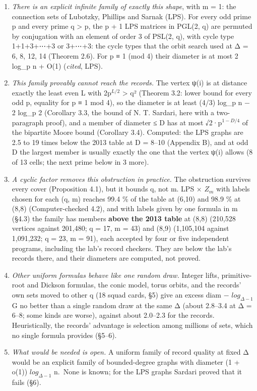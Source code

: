 \documentclass[
  10pt,
]{article}
\providecommand{\tightlist}{%
  \setlength{\itemsep}{0pt}\setlength{\parskip}{0pt}}
\begin{document}
\begin{enumerate}
\def\labelenumi{\arabic{enumi}.}
\tightlist
\item
  \emph{There is an explicit infinite family of exactly this shape},
  with m = 1: the connection sets of Lubotzky, Phillips and Sarnak
  (LPS). For every odd prime p and every prime q \textgreater{} p, the p
  + 1 LPS matrices in PGL(2, q) are permuted by conjugation with an
  element of order 3 of PSL(2, q), with cycle type 1+1+3+⋯+3 or 3+⋯+3:
  the cycle types that the orbit search used at Δ = 6, 8, 12, 14
  (Theorem 2.6). For p ≡ 1 (mod 4) their diameter is at most 2 log\_p n
  + O(1) (\emph{cited}, LPS).
\item
  \emph{This family provably cannot reach the records.} The vertex ψ(i)
  is at distance exactly the least even L with 2p\(^{L/2}\)
  \textgreater{} q² (Theorem 3.2: lower bound for every odd p, equality
  for p ≡ 1 mod 4), so the diameter is at least (4/3) log\_p n − 2
  log\_p 2 (Corollary 3.3, the bound of N. T. Sardari, here with a
  two-paragraph proof), and a member of diameter ≤ D has at most
  √2·p\(^{1−D/4}\) of the bipartite Moore bound (Corollary 3.4).
  Computed: the LPS graphs are 2.5 to 19 times below the 2013 table at D
  = 8--10 (Appendix B), and at odd D the largest member is usually
  exactly the one that the vertex ψ(i) allows (8 of 13 cells; the next
  prime below in 3 more).
\item
  \emph{A cyclic factor removes this obstruction in practice.} The
  obstruction survives every cover (Proposition 4.1), but it bounds q,
  not m. LPS × \(Z_{m}\) with labels chosen for each (q, m) reaches 99.4
  \% of the table at (6,10) and 98.9 \% at (8,8) (Computer-checked 4.2),
  and with labels given by one formula in m (§4.3) the family has
  members \textbf{above the 2013 table} at (8,8) (210,528 vertices
  against 201,480; q = 17, m = 43) and (8,9) (1,105,104 against
  1,091,232; q = 23, m = 91), each accepted by four or five independent
  programs, including the lab's record checkers. They are below the
  lab's records there, and their diameters are computed, not proved.
\item
  \emph{Other uniform formulas behave like one random draw.} Integer
  lifts, primitive-root and Dickson formulas, the conic model, torus
  orbits, and the records' own sets moved to other q (18 squad cards,
  §5) give an excess diam − \(log_{Δ−1}\)\textbar G\textbar{} no better
  than a single random draw at the same Δ (about 2.8--3.4 at Δ = 6--8;
  some kinds are worse), against about 2.0--2.3 for the records.
  Heuristically, the records' advantage is selection among millions of
  sets, which no single formula provides (§5--6).
\item
  \emph{What would be needed is open.} A uniform family of record
  quality at fixed Δ would be an explicit family of bounded-degree
  graphs with diameter (1 + o(1)) \(log_{Δ−1}\) n.~None is known; for
  the LPS graphs Sardari proved that it fails (§6).
\end{enumerate}
\end{document}
